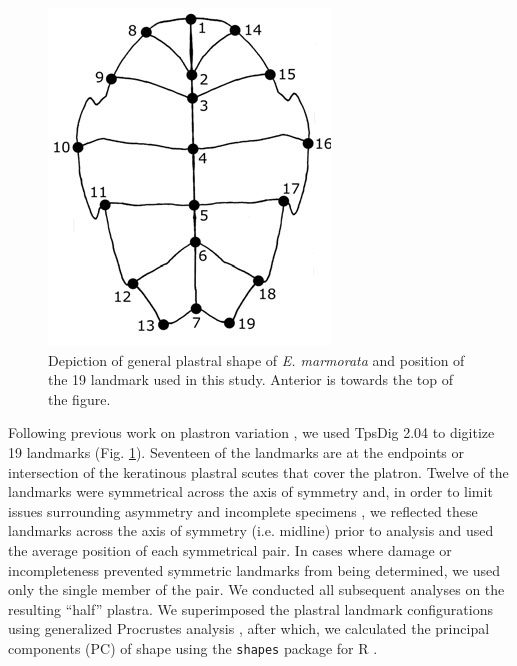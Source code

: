 \documentclass[12pt,letterpaper]{article}
\begin{document}
\begin{figure}[h]
  \centering
  \includegraphics[height = 0.5\textheight, width = \textwidth, keepaspectratio = true]{figure/plastra}
  \caption{Depiction of general plastral shape of \textit{E. marmorata} and position of the 19 landmark used in this study. Anterior is towards the top of the figure.}
  \label{fig:plastra}
\end{figure}


Following previous work on plastron variation \citep{Angielczyk2007,Angielczyk2011,Angielczyk2013a}, we used TpsDig 2.04 \citep{Rohlf2005} to digitize 19 landmarks (Fig. \ref{fig:plastra}). Seventeen of the landmarks are at the endpoints or intersection of the keratinous plastral scutes that cover the platron. Twelve of the landmarks were symmetrical across the axis of symmetry and, in order to limit issues surrounding asymmetry and incomplete specimens \citep{Klingenberg2002}, we reflected these landmarks across the axis of symmetry (i.e. midline) prior to analysis and used the average position of each symmetrical pair. In cases where damage or incompleteness prevented symmetric landmarks from being determined, we used only the single member of the pair. We conducted all subsequent analyses on the resulting ``half'' plastra. We superimposed the plastral landmark configurations using generalized Procrustes analysis \citep{Dryden1998a}, after which, we calculated the principal components (PC) of shape using the \texttt{shapes} package for R \citep{2015,Dryden2013}.
\end{document}
